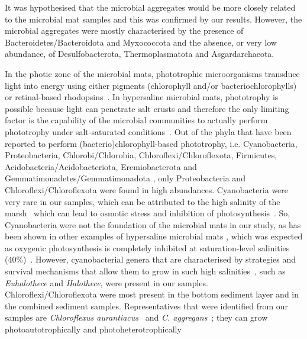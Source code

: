    It was hypothesised that the microbial aggregates would be more closely related to the microbial mat samples 
   and this was confirmed by our results. 
   However, the microbial aggregates were mostly characterised by the presence of Bacteroidetes/Bacteroidota and Myxococcota 
   and the absence, or very low abundance, of Desulfobacterota, Thermoplasmatota and Asgardarchaeota.

   In the photic zone of the microbial mats, phototrophic microorganisms transduce light into energy 
   using either pigments 
   (chlorophyll and/or bacteriochlorophylls) or retinal-based rhodopsins~\citep{kurth_carbon_2021}. 
   In hypersaline microbial mats, phototrophy is possible because light can penetrate salt crusts and therefore 
   the only limiting factor is the capability of the microbial communities to actually perform 
   phototrophy under salt-saturated conditions~\citep{meier_limitation_2021}. 
   Out of the phyla that have been reported to perform (bacterio)chlorophyll-based phototrophy, 
   i.e. Cyanobacteria, Proteobacteria, Chlorobi/Chlorobia, Chloroflexi/Chloroflexota, Firmicutes, 
   Acidobacteria/Acidobacteriota, 
   Eremiobacterota and Gemmatimonadetes/Gemmatimonadota 
   \citep{zeng_phototrophic_2017, zheng_characterization_2022}, 
   only Proteobacteria and Chloroflexi/Chloroflexota were found in high abundances. 
   Cyanobacteria were very rare in our samples, which can be attributed to the 
   high salinity of the marsh~\citep{diloreto_microbial_2019} 
   which can lead to osmotic stress and inhibition of photosynthesis~\citep{sudhir_effects_2004}. 
   So, Cyanobacteria were not the foundation of the microbial mats in our study, 
   as has been shown in other examples of hypersaline microbial mats 
   \citep{bolhuis_molecular_2014, wong_molecular_2016}, 
   which was expected as oxygenic photosynthesis is completely inhibited
   at saturation-level salinities (40\%)~\citep{meier_limitation_2021}. 
   However, cyanobacterial genera that are characterised by strategies and survival mechanisms 
   that allow them to grow in such high salinities~\citep{oren_cyanobacteria_2015}, 
   such as \textit{Euhalothece} and \textit{Halothece}, were present in our samples. 
   Chloroflexi/Chloroflexota were most present in the bottom sediment layer and 
   in the combined sediment samples. 
   Representatives that were identified from our samples are 
   \textit{Chloroflexus aurantiacus}~\citep{pierson_phototrophic_1974}
   and \textit{C. aggregans}~\citep{hanada_chloroflexus_1995}; 
   they can grow photoautotrophically and photoheterotrophically 

